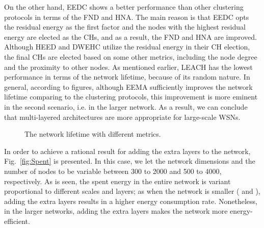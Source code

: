 \documentclass[journal]{IEEEtran}
\begin{document}
On the other hand, EEDC shows a better performance than other clustering protocols in terms of the FND and HNA.  The main reason is that EEDC opts the residual energy as the first factor and the nodes with the highest residual energy are elected as the CHs, and as a result, the FND and HNA are improved.  Although HEED and DWEHC utilize the residual energy in their CH election, the final CHs are elected based on some other metrics, including the node degree and the proximity to other nodes.  As mentioned earlier, LEACH has the lowest performance in terms of the network lifetime, because of its random nature.  In general, according to figures, although EEMA sufficiently improves the network lifetime comparing to the clustering protocols, this improvement is more eminent in the second scenario, i.e. in the larger network.  As a result, we can conclude that multi-layered architectures are more appropriate for large-scale WSNs. 

\begin{figure*}[t]
	\centering
	\caption[Optional caption for list of figures]{The network lifetime with different metrics.}
	\label{fig:Lifetime}
\end{figure*}

In order to achieve a rational result for adding the extra layers to the network, Fig.~\ref{fig:Spent} is presented.  In this case, we let the network dimensions and the number of nodes to be variable between 300 to 2000 and 500 to 4000, respectively. As is seen, the spent energy in the entire network is variant proportional to different scales and layers; as when the network is smaller ( and ), adding the extra layers results in a higher energy consumption rate.  Nonetheless, in the larger networks, adding the extra layers makes the network more energy-efficient.
\end{document}
